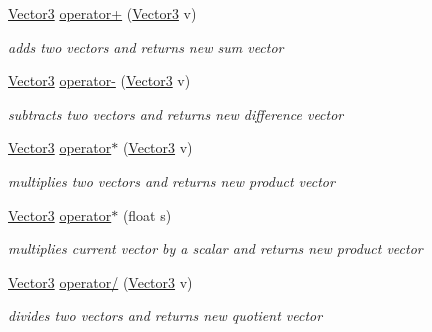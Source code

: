 \begin{DoxyCompactItemize}
\mbox{\label{classVector3_a3132eab81d498564e8bf43d5084b8413}} 
\hyperlink{classVector3}{Vector3} \hyperlink{classVector3_a3132eab81d498564e8bf43d5084b8413}{operator+} (\hyperlink{classVector3}{Vector3} v)
\begin{DoxyCompactList}\small\item\em adds two vectors and returns new sum vector \end{DoxyCompactList}\item 
\mbox{\label{classVector3_a35b5a53bd2745bb3f93604fd47524b7c}} 
\hyperlink{classVector3}{Vector3} \hyperlink{classVector3_a35b5a53bd2745bb3f93604fd47524b7c}{operator-\/} (\hyperlink{classVector3}{Vector3} v)
\begin{DoxyCompactList}\small\item\em subtracts two vectors and returns new difference vector \end{DoxyCompactList}\item 
\mbox{\label{classVector3_a3447410b65f3eb7c948f12e5bb7bc16d}} 
\hyperlink{classVector3}{Vector3} \hyperlink{classVector3_a3447410b65f3eb7c948f12e5bb7bc16d}{operator$\ast$} (\hyperlink{classVector3}{Vector3} v)
\begin{DoxyCompactList}\small\item\em multiplies two vectors and returns new product vector \end{DoxyCompactList}\item 
\mbox{\label{classVector3_abe8452ab6fdaea6a1d1ce3700ad95867}} 
\hyperlink{classVector3}{Vector3} \hyperlink{classVector3_abe8452ab6fdaea6a1d1ce3700ad95867}{operator$\ast$} (float s)
\begin{DoxyCompactList}\small\item\em multiplies current vector by a scalar and returns new product vector \end{DoxyCompactList}\item 
\mbox{\label{classVector3_a7d65a795d80f0ef439713c81e00f1ba1}} 
\hyperlink{classVector3}{Vector3} \hyperlink{classVector3_a7d65a795d80f0ef439713c81e00f1ba1}{operator/} (\hyperlink{classVector3}{Vector3} v)
\begin{DoxyCompactList}\small\item\em divides two vectors and returns new quotient vector \end{DoxyCompactList}\item 

\end{DoxyCompactItemize}
